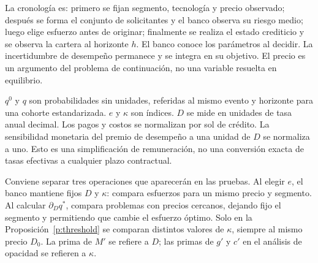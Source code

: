\documentclass[11pt]{article}
\theoremstyle{definition}\newtheorem{assumption}{Supuesto}
\begin{document}
La cronología es: primero se fijan segmento, tecnología y precio observado;
después se forma el conjunto de solicitantes y el banco observa su riesgo
medio; luego elige esfuerzo antes de originar; finalmente se realiza el
estado crediticio y se observa la cartera al horizonte $h$. El banco conoce
los parámetros al decidir. La incertidumbre de desempeño permanece y se
integra en su objetivo. El precio es un argumento del problema de continuación,
no una variable resuelta en equilibrio.

$q^0$ y $q$ son probabilidades sin unidades, referidas al mismo evento y
horizonte para una cohorte estandarizada. $e$ y $\kappa$ son índices. $D$ se
mide en unidades de tasa anual decimal. Los pagos y costos se normalizan por
sol de crédito. La sensibilidad monetaria del premio de desempeño a una unidad
de $D$ se normaliza a uno. Esto es una simplificación de remuneración, no una
conversión exacta de tasas efectivas a cualquier plazo contractual.

Conviene separar tres operaciones que aparecerán en las pruebas. Al elegir
$e$, el banco mantiene fijos $D$ y $\kappa$: compara esfuerzos para un mismo
precio y segmento. Al calcular $\partial_Dq^*$, compara problemas con precios
cercanos, dejando fijo el segmento y permitiendo que cambie el esfuerzo
óptimo. Solo en la Proposición~\ref{p:threshold} se comparan distintos valores
de $\kappa$, siempre al mismo precio $D_0$. La prima de $M'$ se refiere a $D$;
las primas de $g'$ y $c'$ en el análisis de opacidad se refieren a $\kappa$.
\end{document}
